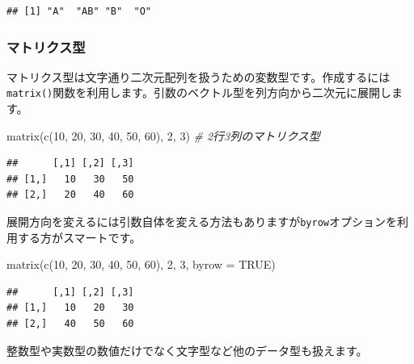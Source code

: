 \documentclass[
  12pt,
]{book}
\newenvironment{Shaded}{\begin{snugshade}}{\end{snugshade}}
\newcommand{\AttributeTok}[1]{\textcolor[rgb]{0.77,0.63,0.00}{#1}}
\newcommand{\CommentTok}[1]{\textcolor[rgb]{0.56,0.35,0.01}{\textit{#1}}}
\newcommand{\ConstantTok}[1]{\textcolor[rgb]{0.00,0.00,0.00}{#1}}
\newcommand{\DecValTok}[1]{\textcolor[rgb]{0.00,0.00,0.81}{#1}}
\newcommand{\FunctionTok}[1]{\textcolor[rgb]{0.00,0.00,0.00}{#1}}
\newcommand{\NormalTok}[1]{#1}
\begin{document}
\begin{verbatim}
## [1] "A"  "AB" "B"  "O"
\end{verbatim}

\hypertarget{ux30deux30c8ux30eaux30afux30b9ux578b}{%
\subsubsection{マトリクス型}\label{ux30deux30c8ux30eaux30afux30b9ux578b}}

マトリクス型は文字通り二次元配列を扱うための変数型です。作成するには\texttt{matrix()}関数を利用します。引数のベクトル型を列方向から二次元に展開します。

\begin{Shaded}
\begin{Highlighting}[]
\FunctionTok{matrix}\NormalTok{(}\FunctionTok{c}\NormalTok{(}\DecValTok{10}\NormalTok{, }\DecValTok{20}\NormalTok{, }\DecValTok{30}\NormalTok{, }\DecValTok{40}\NormalTok{, }\DecValTok{50}\NormalTok{, }\DecValTok{60}\NormalTok{), }\DecValTok{2}\NormalTok{, }\DecValTok{3}\NormalTok{)     }\CommentTok{\# 2行3列のマトリクス型}
\end{Highlighting}
\end{Shaded}

\begin{verbatim}
##      [,1] [,2] [,3]
## [1,]   10   30   50
## [2,]   20   40   60
\end{verbatim}

展開方向を変えるには引数自体を変える方法もありますが\texttt{byrow}オプションを利用する方がスマートです。

\begin{Shaded}
\begin{Highlighting}[]
\FunctionTok{matrix}\NormalTok{(}\FunctionTok{c}\NormalTok{(}\DecValTok{10}\NormalTok{, }\DecValTok{20}\NormalTok{, }\DecValTok{30}\NormalTok{, }\DecValTok{40}\NormalTok{, }\DecValTok{50}\NormalTok{, }\DecValTok{60}\NormalTok{), }\DecValTok{2}\NormalTok{, }\DecValTok{3}\NormalTok{, }\AttributeTok{byrow =} \ConstantTok{TRUE}\NormalTok{)}
\end{Highlighting}
\end{Shaded}

\begin{verbatim}
##      [,1] [,2] [,3]
## [1,]   10   20   30
## [2,]   40   50   60
\end{verbatim}

整数型や実数型の数値だけでなく文字型など他のデータ型も扱えます。
\end{document}

